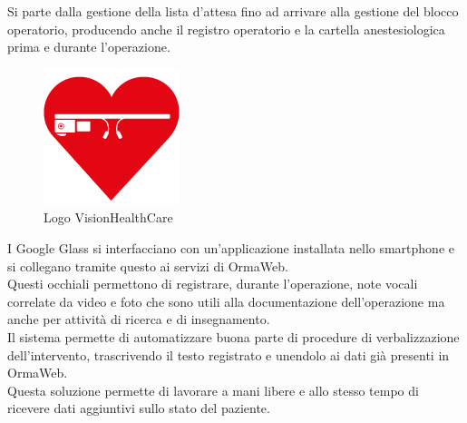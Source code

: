       Si parte dalla gestione della lista d'attesa fino ad arrivare alla gestione del blocco operatorio, producendo anche il registro operatorio e la cartella anestesiologica prima e durante l'operazione.
      \begin{figure}[h]
        \centering
        \includegraphics[scale=0.5]{immagini/vhc.png}
        \caption{Logo VisionHealthCare}
        \label{logoVHC}
      \end{figure}

      I Google Glass si interfacciano con un'applicazione installata nello smartphone e si collegano tramite questo ai servizi di OrmaWeb.\\
      Questi occhiali permettono di registrare, durante l'operazione, note vocali correlate da video e foto che sono utili alla documentazione dell'operazione ma anche per attività di ricerca e di insegnamento.\\
      Il sistema permette di automatizzare buona parte di procedure di verbalizzazione dell'intervento, trascrivendo il testo registrato e unendolo ai dati già presenti in OrmaWeb.\\
      Questa soluzione permette di lavorare a mani libere e allo stesso tempo di ricevere dati aggiuntivi sullo stato del paziente.
    \newpage
